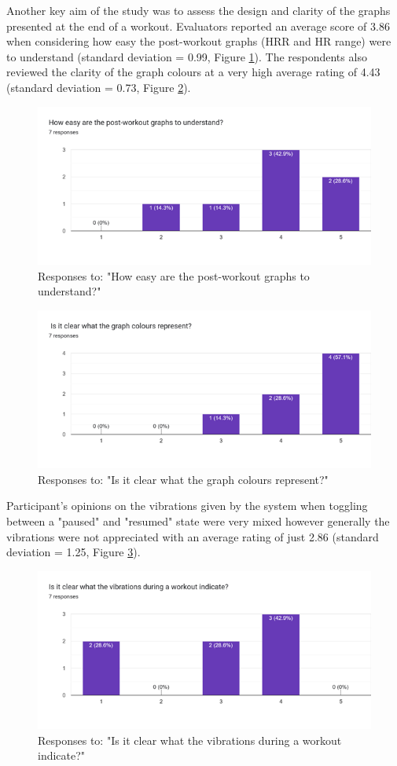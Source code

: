 \documentclass{l4proj}
\begin{document}
Another key aim of the study was to assess the design and clarity of the graphs presented at the end of a workout. Evaluators reported an average score of 3.86 when considering how easy the post-workout graphs (HRR and HR range) were to understand (standard deviation = 0.99, Figure \ref{fig:grapheasy}). The respondents also reviewed the clarity of the graph colours at a very high average rating of 4.43 (standard deviation = 0.73, Figure \ref{fig:graphcolours}).

\begin{figure}[h!]
    \centering
    \includegraphics[width=0.65\linewidth]{dissertation//dissImages/GraphEasy.png}
    \caption{Responses to: "How easy are the post-workout graphs to understand?"}
    \label{fig:grapheasy}
\end{figure}

\begin{figure}[h!]
    \centering
    \includegraphics[width=0.65\linewidth]{dissertation//dissImages/GraphColour.png}
    \caption{Responses to: "Is it clear what the graph colours represent?"}
    \label{fig:graphcolours}
\end{figure}

Participant’s opinions on the vibrations given by the system when toggling between a "paused" and "resumed" state were very mixed however generally the vibrations were not appreciated with an average rating of just 2.86 (standard deviation = 1.25, Figure \ref{fig:vibration}).

\begin{figure}[h!]
    \centering
    \includegraphics[width=0.65\linewidth]{dissertation//dissImages/Vibrations.png}
    \caption{Responses to: "Is it clear what the vibrations during a workout indicate?"}
    \label{fig:vibration}
\end{figure}
\end{document}
